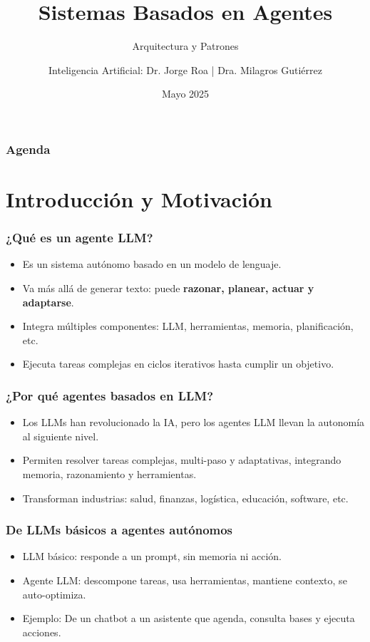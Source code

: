 \documentclass[aspectratio=169,xcolor=dvipsnames, t]{beamer}
\title[Agentes]{Sistemas Basados en Agentes}
\subtitle{Arquitectura y Patrones}
\author[Jorge]{Inteligencia Artificial: Dr. Jorge Roa | Dra. Milagros Gutiérrez}
\institute[CIDISI]{CIDISI - UTN - FRSF}
\date{Mayo 2025}
\begin{document}
\maketitlepage

\begin{frame}
\frametitle{Agenda}
\tableofcontents
\end{frame}

\section{Introducción y Motivación}


\begin{frame}
\frametitle{¿Qué es un agente LLM?}
\begin{itemize}
    \item Es un sistema autónomo basado en un modelo de lenguaje.
    \item Va más allá de generar texto: puede \textbf{razonar, planear, actuar y adaptarse}.
    \item Integra múltiples componentes: LLM, herramientas, memoria, planificación, etc.
    \item Ejecuta tareas complejas en ciclos iterativos hasta cumplir un objetivo.
\end{itemize}
\end{frame}

\begin{frame}
\frametitle{¿Por qué agentes basados en LLM?}
\begin{itemize}
    \item Los LLMs han revolucionado la IA, pero los agentes LLM llevan la autonomía al siguiente nivel.
    \item Permiten resolver tareas complejas, multi-paso y adaptativas, integrando memoria, razonamiento y herramientas.
    \item Transforman industrias: salud, finanzas, logística, educación, software, etc.
\end{itemize}
\end{frame}

\begin{frame}
\frametitle{De LLMs básicos a agentes autónomos}
\begin{itemize}
    \item LLM básico: responde a un prompt, sin memoria ni acción.
    \item Agente LLM: descompone tareas, usa herramientas, mantiene contexto, se auto-optimiza.
    \item Ejemplo: De un chatbot a un asistente que agenda, consulta bases y ejecuta acciones.
\end{itemize}
\end{frame}
\end{document}
